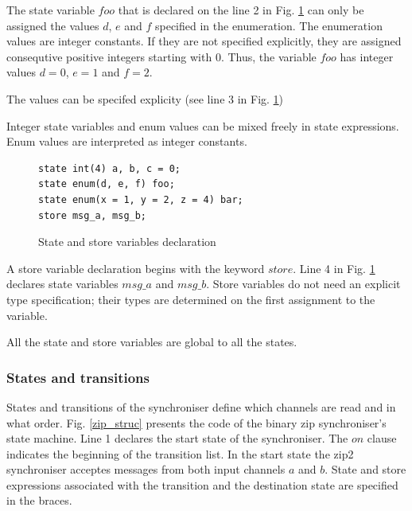 The state variable $foo$ that is declared on the line 2 in Fig. \ref{sync_statevar} can only be assigned the values $d$, $e$ and $f$ specified in the enumeration. The enumeration values are integer constants. If they are not specified explicitly, they are assigned consequtive positive integers starting with 0.
Thus, the variable $foo$ has integer values $d=0$, $e=1$ and $f=2$. %


The values can be specifed explicity (see line 3 in Fig. \ref{sync_statevar})

Integer state variables and enum values can be mixed freely in state expressions. Enum values are interpreted as integer constants.%

\begin{figure}[h!]
\lstset{numbers=left, numberstyle=\small, stepnumber=1, numbersep=8pt}
\begin{lstlisting}[frame=single]
state int(4) a, b, c = 0;
state enum(d, e, f) foo;
state enum(x = 1, y = 2, z = 4) bar;
store msg_a, msg_b;
\end{lstlisting}
\caption{State and store variables declaration}
\label{sync_statevar}
\end{figure}

A store variable declaration begins with the keyword $store$. Line 4 in Fig. \ref{sync_statevar} declares state variables $msg\_a$ and $msg\_b$. Store variables do not need an explicit type specification; their types are determined on the first assignment to the variable.

All the state and store variables are global to all the states.


  \subsubsection{States and transitions}
States and transitions of the synchroniser define which channels are read and in what order. Fig. \ref{zip_struc} presents the code of the binary zip synchroniser's state machine. Line 1 declares the start state of the synchroniser. The $on$ clause indicates the beginning of the transition list. In the start state the zip2 synchroniser acceptes messages from both input channels $a$ and $b$. State and store expressions associated with the transition and the destination state are specified in the braces.

